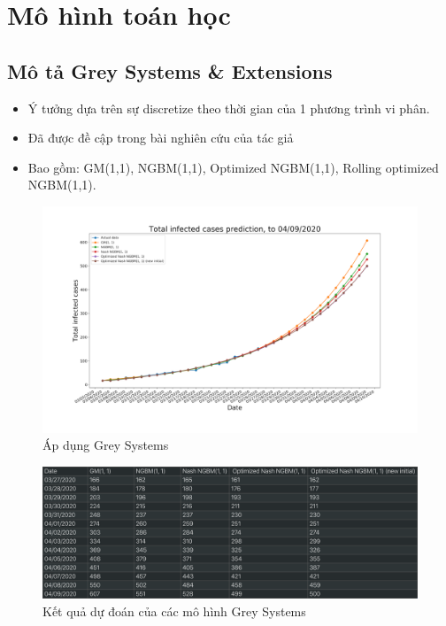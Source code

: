 ﻿\documentclass{article}
\begin{document}
\section{Mô hình toán học}

\subsection{Mô tả Grey Systems \& Extensions}

\begin{itemize}
    \item Ý tưởng dựa trên sự discretize theo thời gian của 1 phương trình vi phân.
    \item Đã được đề cập trong bài nghiên cứu của tác giả \cite{rongbm}
    \item Bao gồm: GM(1,1), NGBM(1,1), Optimized NGBM(1,1), Rolling optimized NGBM(1,1).
\end{itemize}

    \begin{figure}
    \centering
    \includegraphics[scale=0.2]{grey.png}
    \caption{Áp dụng Grey Systems}
    \label{fig:gs}
    \end{figure}

    \begin{figure}
    \centering
    \includegraphics[scale=0.2]{greyData.png}
    \caption{Kết quả dự đoán của các mô hình Grey Systems}
    \label{fig:gsdata}
    \end{figure}
\end{document}
